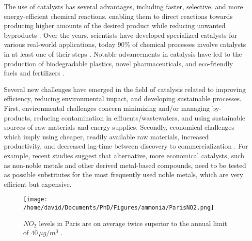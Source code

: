 
The use of catalysts has several advantages, including faster, selective, and more energy-efficient chemical reactions, enabling them to direct reactions towards producing higher amounts of the desired product while reducing unwanted byproducts \parencite{Schlogl2015}.
Over the years, scientists have developed specialized catalysts for various real-world applications, today 90\% of chemical processes involve catalysts in at least one of their steps \parencite{WEINER1998915, DeVries2012}.
Notable advancements in catalysis have led to the production of biodegradable plastics, novel pharmaceuticals, and eco-friendly fuels and fertilizers \parencite{FECHETE20122}.

Several new challenges have emerged in the field of catalysis related to improving efficiency, reducing environmental impact, and developing sustainable processes.
First, environmental challenges concern minimizing and/or managing by-products, reducing contamination in effluents/wastewaters, and using sustainable sources of raw materials \parencite{LUDWIG2017313, Lange2021} and energy supplies.
Secondly, economical challenges which imply using cheaper, readily available raw materials, increased productivity, and decreased lag-time between discovery to commercialization \parencite{Keisuke2019, Gunay2021}.
For example, recent studies suggest that alternative, more economical catalysts, such as non-noble metals \parencite{Zhong2021} and other derived metal-based compounds, need to be tested as possible substitutes for the most frequently used noble metals, which are very efficient but expensive.

\begin{figure}[!htb]
    \centering
    \texttt{[image: /home/david/Documents/PhD/Figures/ammonia/ParisNO2.png]}
    \caption{
        $NO_2$ levels in Paris are on average twice superior to the annual limit of $40 \, \mu g / m^3$ \parencite{AirParis}.
    }
    \label{fig:NO2Paris}
\end{figure}

